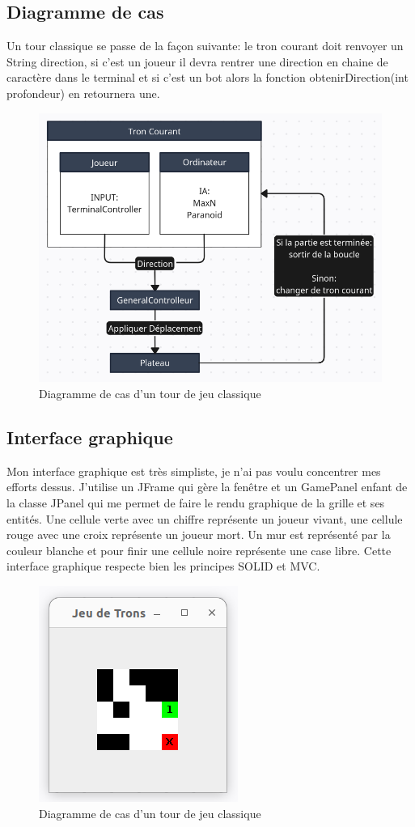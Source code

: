 \documentclass[a4paper,12pt]{article}
\begin{document}
\subsection{Diagramme de cas}
Un tour classique se passe de la façon suivante:
le tron courant doit renvoyer un String direction, si c'est un joueur il devra rentrer une direction en chaine de caractère dans le terminal et si c'est un bot alors la fonction obtenirDirection(int profondeur) en retournera une.

	\begin{figure}[h!]
		\centering	\includegraphics[width=0.5\linewidth]{DiagTourClassique}
		\caption{Diagramme de cas d'un tour de jeu classique}
	\end{figure}


\subsection{Interface graphique}
Mon interface graphique est très simpliste, je n'ai pas voulu concentrer mes efforts dessus. 
J'utilise un JFrame qui gère la fenêtre et un GamePanel enfant de la classe JPanel qui me permet de faire le rendu graphique de la grille et ses entités.
Une cellule verte avec un chiffre représente un joueur vivant, une cellule rouge avec une croix représente un joueur mort. Un mur est représenté par la couleur blanche et pour finir une cellule noire représente une case libre.
Cette interface graphique respecte bien les principes SOLID et MVC.

\begin{figure}[h!]
		\centering	\includegraphics[width=0.3\linewidth]{InterfaceGraphique}
		\caption{Diagramme de cas d'un tour de jeu classique}
	\end{figure}
\end{document}
